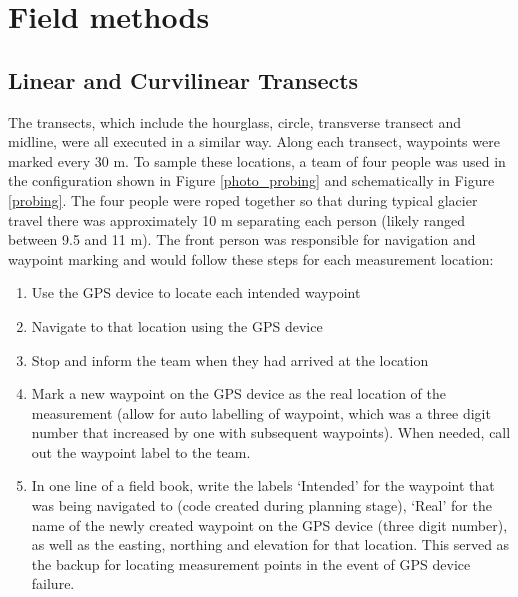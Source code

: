 \documentclass{sfuthesis}
\begin{document}
\section{Field methods}

\subsection{Linear and Curvilinear Transects}
\label{sec:transects}

The transects, which include the hourglass, circle, transverse transect and midline, were all executed in a similar way. Along each transect, waypoints were marked every 30 m. To sample these locations, a team of four people was used in the configuration shown in Figure \ref{photo_probing} and schematically in Figure \ref{probing}. The four people were roped together so that during typical glacier travel there was approximately 10 m separating each person (likely ranged between 9.5 and 11 m). The front person was responsible for navigation and waypoint marking and would follow these steps for each measurement location:
\begin{enumerate}
\item Use the GPS device to locate each intended waypoint
\item Navigate to that location using the GPS device
\item Stop and inform the team when they had arrived at the location
\item Mark a new waypoint on the GPS device as the real location of the measurement (allow for auto labelling of waypoint, which was a three digit number that increased by one with subsequent waypoints). When needed, call out the waypoint label to the team.
\item In one line of a field book, write the labels `Intended' for the waypoint that was being navigated to (code created during planning stage), `Real' for the name of the newly created waypoint on the GPS device (three digit number), as well as the easting, northing and elevation for that location. This served as the backup for locating measurement points in the event of GPS device failure. 
\end{enumerate}
\end{document}
